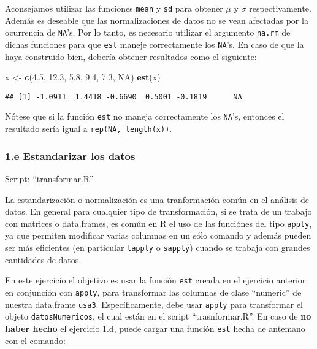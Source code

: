 \documentclass[]{article}
\newenvironment{Shaded}{}{}
\newcommand{\KeywordTok}[1]{\textcolor[rgb]{0.00,0.44,0.13}{\textbf{{#1}}}}
\newcommand{\FloatTok}[1]{\textcolor[rgb]{0.25,0.63,0.44}{{#1}}}
\newcommand{\OtherTok}[1]{\textcolor[rgb]{0.00,0.44,0.13}{{#1}}}
\newcommand{\NormalTok}[1]{{#1}}
\begin{document}
Aconsejamos utilizar las funciones \texttt{mean} y \texttt{sd} para
obtener $\mu$ y $\sigma$ respectivamente. Además es deseable que las
normalizaciones de datos no se vean afectadas por la ocurrencia de
\texttt{NA}'s. Por lo tanto, es necesario utilizar el argumento
\texttt{na.rm} de dichas funciones para que \texttt{est} maneje
correctamente los \texttt{NA}'s. En caso de que la haya construido bien,
debería obtener resultados como el siguiente:

\begin{Shaded}
\begin{Highlighting}[]
\NormalTok{x <- }\KeywordTok{c}\NormalTok{(}\FloatTok{4.5}\NormalTok{, }\FloatTok{12.3}\NormalTok{, }\FloatTok{5.8}\NormalTok{, }\FloatTok{9.4}\NormalTok{, }\FloatTok{7.3}\NormalTok{, }\OtherTok{NA}\NormalTok{)}
\KeywordTok{est}\NormalTok{(x)}
\end{Highlighting}
\end{Shaded}
\begin{verbatim}
## [1] -1.0911  1.4418 -0.6690  0.5001 -0.1819      NA
\end{verbatim}
Nótese que si la función \texttt{est} no maneja correctamente los
\texttt{NA}'s, entonces el resultado sería igual a
\texttt{rep(NA, length(x))}.

\subsubsection{1.e Estandarizar los datos}

Script: ``transformar.R''

La estandarización o normalización es una tranformación común en el
análisis de datos. En general para cualquier tipo de transformación, si
se trata de un trabajo con matrices o data.frames, es común en R el uso
de las funciónes del tipo \texttt{apply}, ya que permiten modificar
varias columnas en un sólo comando y además pueden ser más eficientes
(en particular \texttt{lapply} o \texttt{sapply}) cuando se trabaja con
grandes cantidades de datos.

En este ejercicio el objetivo es usar la función \texttt{est} creada en
el ejercicio anterior, en conjunción con \texttt{apply}, para
transformar las columnas de clase ``numeric'' de nuestra data.frame
\texttt{usa3}. Específicamente, debe usar \texttt{apply} para
transformar el objeto \texttt{datosNumericos}, el cual están en el
script ``trasnformar.R''. En caso de \textbf{no haber hecho} el
ejercicio 1.d, puede cargar una función \texttt{est} hecha de antemano
con el comando:
\end{document}
